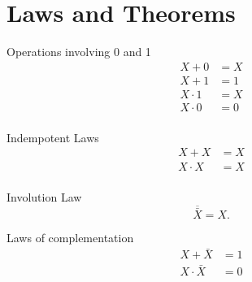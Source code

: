 \documentclass{report}
\begin{document}
\section{Laws and Theorems}

\begin{minipage}[t]{0.5\linewidth}
	\begin{itemize}

		\ii Operations involving 0 and 1
		\begin{align*}
			X + 0     & = X \\
			X + 1     & = 1 \\
			X \cdot 1 & = X \\
			X \cdot 0 & = 0 \\
		\end{align*}

		\ii Indempotent Laws
		\begin{align*}
			X + X     & = X \\
			X \cdot X & = X \\
		\end{align*}

		\ii Involution Law
		\[
			\overline{\bar{X}} = X
			.\]

		\ii Laws of complementation
		\begin{align*}
			X + \bar{X}     & = 1 \\
			X \cdot \bar{X} & = 0 \\
		\end{align*}

	\end{itemize}
\end{minipage}
\end{document}
